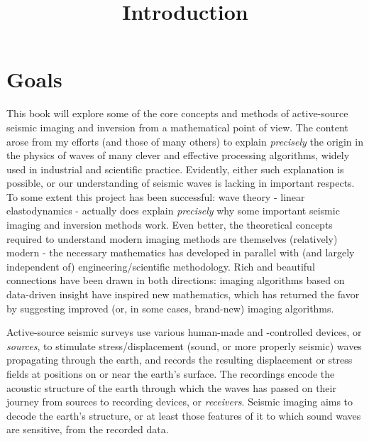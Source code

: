 \title{Introduction}

\section{Goals}
This book will explore some of the core concepts and methods of active-source seismic imaging and inversion from a mathematical point of view. The content arose from my efforts (and those of many others) to explain {\em precisely} the origin in the physics of waves of many clever and effective processing algorithms, widely used in industrial and scientific practice. Evidently, either such explanation is possible, or our understanding of seismic waves is lacking in important respects. To some extent this project has been successful: wave theory - linear elastodynamics -  actually does explain {\em precisely} why some important seismic imaging and inversion methods work. Even better, the theoretical concepts required to understand modern imaging methods are themselves (relatively) modern - the necessary mathematics has developed in parallel with (and largely independent of) engineering/scientific methodology. Rich and beautiful connections have been drawn in both directions: imaging algorithms based on data-driven insight have inspired new mathematics, which has returned the favor by suggesting improved (or, in some cases, brand-new) imaging algorithms.


Active-source seismic surveys use various human-made and -controlled devices, or {\em sources}, to stimulate stress/displacement (sound, or more properly seismic) waves propagating through the earth, and records the resulting displacement or stress fields at positions on or near the earth's surface. The recordings encode the acoustic structure of the earth through which the waves has passed on their journey from sources to recording devices, or {\em receivers}. Seismic imaging aims to decode the earth's structure, or at least those features of it to which sound waves are sensitive, from the recorded data.

